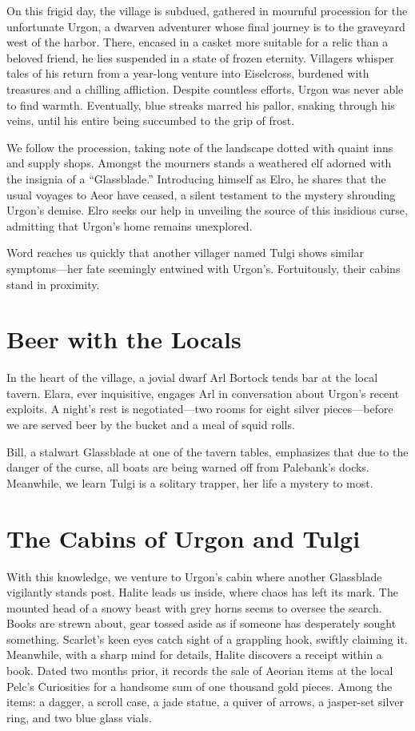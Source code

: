 \documentclass[
  letterpaper,12pt,twoside,twocolumn,openany,
  nodeprecatedcode,bg=full]{dndbook}
\begin{document}
On this frigid day, the village is subdued, gathered in mournful
procession for the unfortunate Urgon, a dwarven adventurer whose final
journey is to the graveyard west of the harbor. There, encased in a
casket more suitable for a relic than a beloved friend, he lies
suspended in a state of frozen eternity. Villagers whisper tales of his
return from a year-long venture into Eiselcross, burdened with treasures
and a chilling affliction. Despite countless efforts, Urgon was never
able to find warmth. Eventually, blue streaks marred his pallor, snaking
through his veins, until his entire being succumbed to the grip of
frost.

We follow the procession, taking note of the landscape dotted with
quaint inns and supply shops. Amongst the mourners stands a weathered
elf adorned with the insignia of a ``Glassblade.'' Introducing himself
as Elro, he shares that the usual voyages to Aeor have ceased, a silent
testament to the mystery shrouding Urgon's demise. Elro seeks our help
in unveiling the source of this insidious curse, admitting that Urgon's
home remains unexplored.

Word reaches us quickly that another villager named Tulgi shows similar
symptoms---her fate seemingly entwined with Urgon's. Fortuitously, their
cabins stand in proximity.

\section{Beer with the Locals}\label{beer-with-the-locals}

In the heart of the village, a jovial dwarf Arl Bortock tends bar at the
local tavern. Elara, ever inquisitive, engages Arl in conversation about
Urgon's recent exploits. A night's rest is negotiated---two rooms for
eight silver pieces---before we are served beer by the bucket and a meal
of squid rolls.

Bill, a stalwart Glassblade at one of the tavern tables, emphasizes that
due to the danger of the curse, all boats are being warned off from
Palebank's docks. Meanwhile, we learn Tulgi is a solitary trapper, her
life a mystery to most.

\section{The Cabins of Urgon and
Tulgi}\label{the-cabins-of-urgon-and-tulgi}

With this knowledge, we venture to Urgon's cabin where another
Glassblade vigilantly stands post. Halite leads us inside, where chaos
has left its mark. The mounted head of a snowy beast with grey horns
seems to oversee the search. Books are strewn about, gear tossed aside
as if someone has desperately sought something. Scarlet's keen eyes
catch sight of a grappling hook, swiftly claiming it. Meanwhile, with a
sharp mind for details, Halite discovers a receipt within a book. Dated
two months prior, it records the sale of Aeorian items at the local
Pelc's Curiosities for a handsome sum of one thousand gold pieces. Among
the items: a dagger, a scroll case, a jade statue, a quiver of arrows, a
jasper-set silver ring, and two blue glass vials.
\end{document}
